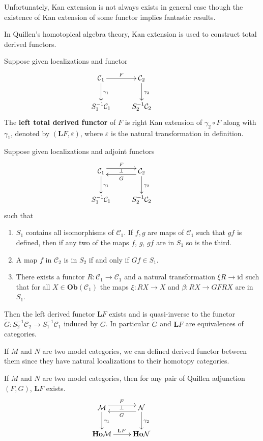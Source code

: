 Unfortunately, Kan extension is not always exists in general case though the existence of Kan extension of some functor implies fantastic results.
\par
In Quillen's homotopical algebra theory, Kan extension is used to construct total derived functors.
\begin{mydefn}
Suppose given localizations and functor
\[
\xymatrix{
\mathcal{C}_{1} \ar[r]^{F} \ar[d]^{\gamma_{1}}& \mathcal{C}_{2} \ar[d]^{\gamma_{2}}&\\
S_{1}^{-1}\mathcal{C}_{1}&S_{2}^{-1}\mathcal{C}_{2}
}
\]
The \textbf{left total derived functor} of $F$ is right Kan extension of $\gamma_{2} \circ F$ along with $\gamma_{1}$, denoted by $(\mathbf{L}F, \varepsilon)$, where $\varepsilon$ is the natural transformation in definition.
\end{mydefn}
\begin{prop}
Suppose given localizations and adjoint functors
\[
\xymatrix{
\mathcal{C}_{1} \ar@<1ex>[r]^{F} \ar[d]^{\gamma_{1}}& \mathcal{C}_{2} \ar@<1ex>[l]^{G}_{\bot} \ar[d]^{\gamma_{2}}&\\
S_{1}^{-1}\mathcal{C}_{1}&S_{2}^{-1}\mathcal{C}_{2}
}
\]
such that
\begin{enumerate}
    \item $S_{1}$ contains all isomorphisms of $\mathcal{C}_{1}$. If $f,g$ are maps of $\mathcal{C}_{1}$ such that $gf$ is defined, then if any two of the maps $f$, $g$, $gf$ are in $S_{1}$ so is the third.
    \item A map $f$ in $\mathcal{C}_{2}$ is in $S_{2}$ if and only if $Gf \in S_{1}$.
    \item There exists a functor $R:\mathcal{C}_{1} \rightarrow \mathcal{C}_{1}$ and a natural transformation $\xi R \rightarrow \text{id}$ such that for all $X \in \mathbf{Ob}(\mathcal{C}_{1})$ the maps $\xi: RX \rightarrow X$ and $\beta: RX \rightarrow GFRX$ are in $S_{1}$.
\end{enumerate}
\par
Then the left derived functor $\mathbf{L}F$ exists and is quasi-inverse to the functor $\widetilde{G}: S_{2}^{-1}\mathcal{C}_{2} \rightarrow S_{1}^{-1}\mathcal{C}_{1}$ induced by $G$. In particular $\widetilde{G}$ and $\mathbf{L}F$ are equivalences of categories.
\end{prop}

If $M$ and $N$ are two model categories, we can defined derived functor between them since they have natural localizations to their homotopy categories.
\begin{cor}
If $M$ and $N$ are two model categories, then for any pair of Quillen adjunction $(F,G)$, $\mathbf{L}F$ exists.
\[
\xymatrix{
\mathcal{M} \ar@<1ex>[r]^{F} \ar[d]^{\gamma_{1}}& \mathcal{N} \ar@<1ex>[l]^{G}_{\bot} \ar[d]^{\gamma_{2}}&\\
\mathbf{Ho}\mathcal{M} \ar[r]^{\mathbf{L}F}&\mathbf{Ho}\mathcal{N}
}
\]
\end{cor}